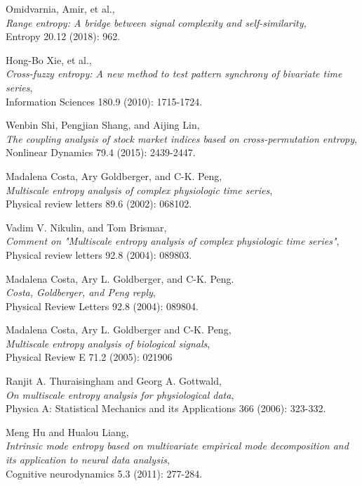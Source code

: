 \documentclass[12pt, a4paper, titlepage, openany]{book}
\begin{document}
\begin{thebibliography}{9}
Omidvarnia, Amir, et al., \\
\emph{Range entropy: A bridge between signal complexity and self-similarity,}\\
Entropy 20.12 (2018): 962.

Hong-Bo Xie, et al.,\\
\emph{Cross-fuzzy entropy: A new method to test pattern synchrony of bivariate time series},\\
Information Sciences 180.9 (2010): 1715-1724.

Wenbin Shi, Pengjian Shang, and Aijing Lin,\\
\emph{The coupling analysis of stock market indices based on cross-permutation entropy},
Nonlinear Dynamics 79.4 (2015): 2439-2447.

Madalena Costa, Ary Goldberger, and C-K. Peng,\\
\emph{Multiscale entropy analysis of complex physiologic time series},\\
Physical review letters  89.6 (2002): 068102.

Vadim V. Nikulin, and Tom Brismar,\\
\emph{Comment on "Multiscale entropy analysis of complex physiologic time series"},\\
Physical review letters  92.8 (2004): 089803.

Madalena Costa, Ary L. Goldberger, and C-K. Peng. \\
\emph{Costa, Goldberger, and Peng reply},\\
Physical Review Letters 92.8 (2004): 089804.
                
Madalena Costa, Ary L. Goldberger and C-K. Peng,\\
\emph{Multiscale entropy analysis of biological signals},\\
Physical Review E 71.2 (2005): 021906

Ranjit A. Thuraisingham and Georg A. Gottwald,\\
\emph{On multiscale entropy analysis for physiological data},\\
Physica A: Statistical Mechanics and its Applications 366 (2006): 323-332.

Meng Hu and Hualou Liang,\\
\emph{Intrinsic mode entropy based on multivariate empirical mode decomposition and its application to neural data analysis},\\
Cognitive neurodynamics 5.3 (2011): 277-284.


\end{thebibliography}
\end{document}
